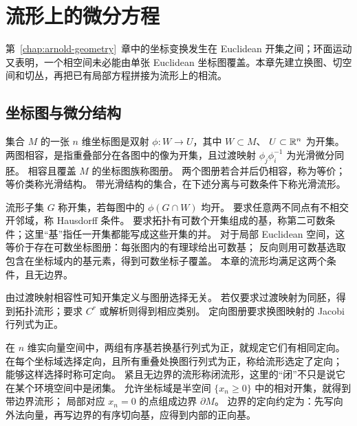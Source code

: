 \chapter{流形上的微分方程}\label{chap:manifolds}

第~\ref{chap:arnold-geometry}~章中的坐标变换发生在 Euclidean 开集之间；环面运动又表明，一个相空间未必能由单张 Euclidean 坐标图覆盖。本章先建立换图、切空间和切丛，再把已有局部方程拼接为流形上的相流。

\section{坐标图与微分结构}
\begin{definition}
集合 $M$ 的一张 $n$ 维坐标图是双射 $\phi:W\to U$，其中 $W\subset M$、
$U\subset\mathbb{R}^n$ 为开集。
两图相容，是指重叠部分在各图中的像为开集，且过渡映射
$\phi_j\phi_i^{-1}$ 为光滑微分同胚。
相容且覆盖 $M$ 的坐标图族称图册。
两个图册若合并后仍相容，称为等价；等价类称光滑结构。
带光滑结构的集合，在下述分离与可数条件下称光滑流形。
\end{definition}
\begin{definition}
流形子集 $G$ 称开集，若每图中的 $\phi(G\cap W)$ 均开。
要求任意两不同点有不相交开邻域，称 Hausdorff 条件。
要求拓扑有可数个开集组成的基，称第二可数条件；这里“基”指任一开集都能写成这些开集的并。
对于局部 Euclidean 空间，这等价于存在可数坐标图册：每张图内的有理球给出可数基；
反向则用可数基选取包含在坐标域内的基元素，得到可数坐标子覆盖。
本章的流形均满足这两个条件，且无边界。
\end{definition}
由过渡映射相容性可知开集定义与图册选择无关。
若仅要求过渡映射为同胚，得到拓扑流形；要求 $C^r$ 或解析则得到相应类别。
定向图册要求换图映射的 Jacobi 行列式为正。


\begin{definition}[定向、闭流形与带边界流形]\label{def:orientation-boundary}
在 $n$ 维实向量空间中，两组有序基若换基行列式为正，就规定它们有相同定向。
在每个坐标域选择定向，且所有重叠处换图行列式为正，称给流形选定了定向；
能够这样选择时称可定向。
紧且无边界的流形称闭流形，这里的“闭”不只是说它在某个环境空间中是闭集。
允许坐标域是半空间 $\{x_n\geq0\}$ 中的相对开集，就得到带边界流形；
局部对应 $x_n=0$ 的点组成边界 $\partial M$。
边界的定向约定为：先写向外法向量，再写边界的有序切向基，应得到内部的正向基。
\end{definition}

